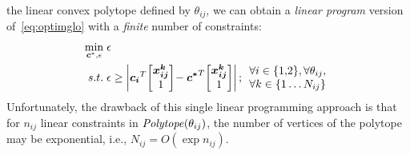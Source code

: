 the linear convex polytope defined by $\theta_{ij}$, we can obtain a
\emph{linear program} version of~\eqref{eq:optimglo} with a \emph{finite} 
number of constraints:
\begin{align}
\min_{\boldsymbol{c}^*,\epsilon} \; & \epsilon \label{eq:linear_exp} \\
s.t. \;       & \epsilon \geq \left| \boldsymbol{c_i}^T \! \begin{bmatrix} \boldsymbol{x_{ij}^k}\\1 \end{bmatrix} \! - \boldsymbol{c^*}^T \! \begin{bmatrix} \boldsymbol{x_{ij}^k}\\1 \end{bmatrix} \right|; 
\begin{array}{l}
\forall i \in \{ 1,\!2 \}, \forall \theta_{ij} \nonumber,\\ 
\forall k \in \{ 1 \ldots N_{ij} \}
\end{array}
\end{align}
Unfortunately, the drawback of this single linear programming approach
is that for $n_{ij}$ linear constraints in $\mathit{Polytope}(\theta_{ij})$, the
number of vertices of the polytope may be exponential, i.e., $N_{ij} =
O(\exp n_{ij})$.  

